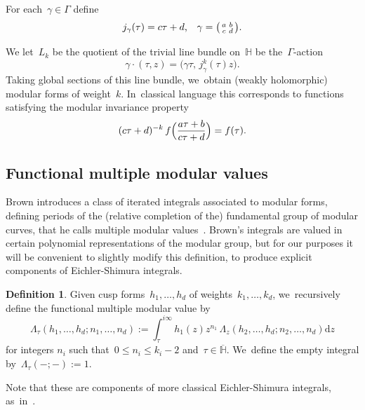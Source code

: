 \documentclass[JEP,XML,SOM,Unicode,published]{cedram}
\theoremstyle{plain}
\theoremstyle{definition}
\newtheorem{definition}[theoremcounter]{Definition}
\newcommand{\tx}{\text}
\newcommand{\nbd}{\nobreakdash-\hspace{0pt}}
\newcommand{\rmd}{\ensuremath{\mathrm{d}}}
\let\ov\overline
\newenvironment{psmatrix}{\bigl(\begin{smallmatrix}}{\end{smallmatrix}\bigr)}
\newcommand{\HS}{\ensuremath{\mathbb{H}}}
\let\Ga\Gamma
\let\ga\gamma
\newcommand{\dz}{\rmd z}
\begin{document}
For each~$\ga\in\Ga$ define
\begin{equation*}
j_\ga(\tau)
=
c \tau + d
\tx{,}\quad
\ga = \begin{psmatrix} a & b \\ c & d \end{psmatrix}
\tx{.}
\end{equation*}

We let~$L_k$ be the quotient of the trivial line bundle on~$\HS$ be the~$\Ga$\nbd{}action
\begin{equation*}
\gamma\cdot(\tau,z)
=
\bigl(\gamma\tau,\, j_\ga^k(\tau)z \bigr)
\tx{.}
\end{equation*}
Taking global sections of this line bundle, we~obtain (weakly holomorphic) modular forms of weight~$k$. In~classical language this corresponds to functions satisfying the modular invariance property
\begin{equation*}
(c \tau + d)^{-k}\,
f\Bigl(\frac{a \tau + b}{c \tau + d} \Bigr)
=
f(\tau)
\tx{.}
\end{equation*}

\subsection{Functional multiple modular values}
\label{ssec:preliminaries:multi_modular}

Brown introduces a class of iterated integrals associated to modular forms, defining periods of the (relative completion of the) fundamental group of modular curves, that he calls multiple modular values~\cite{brown17}. Brown's integrals are valued in certain polynomial representations of the modular group, but for our purposes it will be convenient to slightly modify this definition, to produce explicit components of Eichler-Shimura integrals.

\begin{definition}
\label{def:func_mult_mod}
Given cusp forms~$h_1,\ldots,h_d$ of weights~$k_1,\ldots,k_d$, we~recursively define the functional multiple modular value by
\begin{equation*}
\Lambda_\tau(h_1,\ldots,h_d;n_1,\ldots,n_d)
:=
\int_\tau^{i\infty} h_1(z) z^{n_1}\, \Lambda_z(h_2,\ldots,h_d;n_2,\ldots,n_d) \dz
\end{equation*}
for integers $n_i$ such that~$0\leq n_i\leq k_i-2$ and~$\tau\in\ov{\HS}$. We~define the empty integral by~$\Lambda_\tau(-;-):=1$.
\end{definition}

Note that these are components of more classical Eichler-Shimura integrals, as~in~\cite{brown17}.
\end{document}
